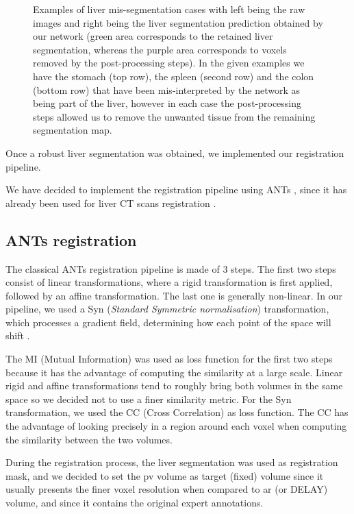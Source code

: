 \begin{figure}[ht!]
\begin{mdframed}[backgroundcolor=blue!50,linecolor=blue!50]
\begin{minipage}{0.45\linewidth}
		\end{minipage}
		\caption{Examples of liver mis-segmentation cases with left being the raw images and right being the liver segmentation prediction obtained by our  network (green area corresponds to the retained liver segmentation, whereas the purple area corresponds to voxels removed by the post-processing steps). In the given examples we have the stomach (top row), the spleen (second row) and the colon (bottom row) that have been mis-interpreted by the network as being part of the liver, however in each case the post-processing steps allowed us to remove the unwanted tissue from the remaining segmentation map.}
		\label{fig:LITS_networkMisSeg_otherOrgans}
	\end{mdframed}
\end{figure}

Once a robust liver segmentation was obtained, we implemented our
registration pipeline.

We have decided to implement the registration pipeline using ANTs \cite{avants2009advanced}, since it has already been used for liver
CT scans registration \cite{Zhao2019,Zhao2020}.

\subsection{ANTs registration}\label{tcia-db-ants-registration}

The classical ANTs registration pipeline is made of 3 steps. The first
two steps consist of linear transformations, where a rigid
transformation is first applied, followed by an affine transformation.
The last one is generally non-linear. In our pipeline,
we used a Syn (\emph{Standard Symmetric normalisation}) transformation, which
processes a gradient field, determining how each point of the space will
shift \cite{Avants2008}.

The MI (Mutual Information) was used as loss function for the first two
steps because it has the advantage of computing the similarity at a
large scale. Linear rigid and affine transformations tend to roughly bring both volumes
in the same space so we decided not to use a finer similarity metric. For the Syn
transformation, we used the CC (Cross Correlation) as loss function. The CC
has the advantage of looking precisely in a region around each voxel
when computing the similarity between the two volumes.

During the registration process, the liver segmentation was used as
registration mask, and we decided to set the \ac{pv} volume as target (fixed)
volume since it usually presents the finer voxel resolution when
compared to \ac{ar} (or DELAY) volume, and since it contains the original
expert annotations.

